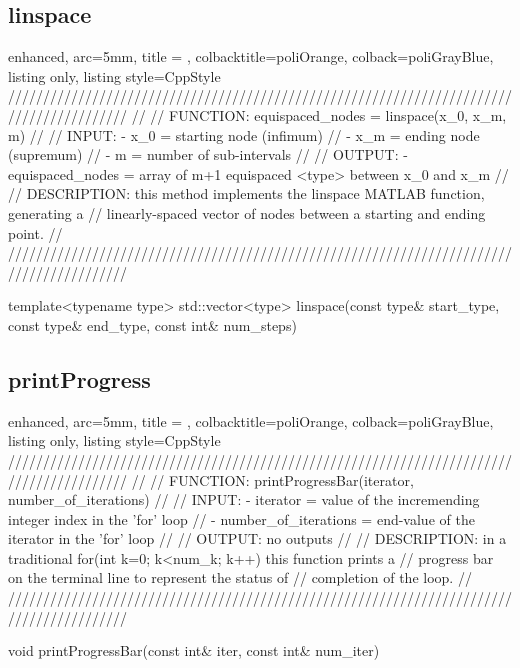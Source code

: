 \documentclass[a4paper, twosided]{book}
\begin{document}
\newpage

\subsection[linspace]{\changefont linspace}\label{SubSec4.3.3}

\begin{tcblisting}{enhanced,
                   arc=5mm,
                   title = \color{black}{\large \ttfamily Utils.cpp/linspace},
                   colbacktitle=poliOrange,
                   colback=poliGrayBlue,
                   listing only,
                   listing style=CppStyle}
/////////////////////////////////////////////////////////////////////////////////////////
//
//       FUNCTION: equispaced_nodes = linspace(x_0, x_m, m)
//                
//          INPUT: - x_0 = starting node (infimum)
//			           - x_m = ending node (supremum)
//                 - m = number of sub-intervals
//
//		     OUTPUT: - equispaced_nodes = array of m+1 equispaced <type> between x_0 and x_m 
//
//    DESCRIPTION: this method implements the linspace MATLAB function, generating a 
//                 linearly-spaced vector of nodes between a starting and ending point.
//
/////////////////////////////////////////////////////////////////////////////////////////

template<typename type>
std::vector<type> linspace(const type& start_type, const type& end_type, const int& num_steps)   
\end{tcblisting}

\subsection[printProgress]{\changefont printProgress}\label{SubSec4.3.4}

\begin{tcblisting}{enhanced,
                   arc=5mm,
                   title = \color{black}{\large \ttfamily Utils.cpp/printProgress},
                   colbacktitle=poliOrange,
                   colback=poliGrayBlue,
                   listing only,
                   listing style=CppStyle}
/////////////////////////////////////////////////////////////////////////////////////////
//
//       FUNCTION: printProgressBar(iterator, number_of_iterations)
//                
//          INPUT: - iterator = value of the incremending integer index in the 'for' loop
//                 - number_of_iterations = end-value of the iterator in the 'for' loop
//          
//         OUTPUT: no outputs
//
//    DESCRIPTION: in a traditional for(int k=0; k<num_k; k++) this function prints a 
//                 progress bar on the terminal line to represent the status of
//                 completion of the loop.
//
/////////////////////////////////////////////////////////////////////////////////////////

void printProgressBar(const int& iter, const int& num_iter)
\end{tcblisting}

\printbibliography
\end{document}
